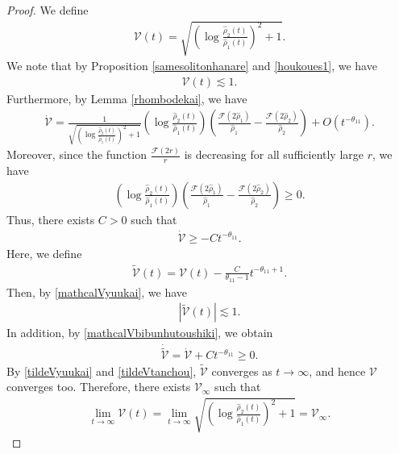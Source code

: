 \documentclass[10pt,a4paper]{amsart}
\numberwithin{equation}{section}
\begin{document}
\begin{proof}
We define
\begin{align}\label{mathcalVdef}
\mathcal{V}(t)=\sqrt{ \left(\log{\frac{\hat{\rho}_2(t)}{\hat{\rho}_1(t)}}\right)^2+1}.
\end{align}
We note that by Proposition \ref{samesolitonhanare} and \eqref{houkoues1}, we have
\begin{align}\label{mathcalVyuukai}
\mathcal{V}(t)\lesssim 1.
\end{align}
Furthermore, by Lemma \ref{rhombodekai}, we have
\begin{align*}
\dot{\mathcal{V}}=\frac{1}{\sqrt{ \left(\log{\frac{\hat{\rho}_2(t)}{\hat{\rho}_1(t)}}\right)^2+1}}\left(\log{\frac{\hat{\rho}_2(t)}{\hat{\rho}_1(t)}} \right)\left(\frac{\mathcal{F}(2\hat{\rho}_1)}{\hat{\rho}_1}-\frac{\mathcal{F}(2\hat{\rho}_2)}{\hat{\rho}_2}\right)+O\left(t^{-\theta_{11}}\right).
\end{align*}
Moreover, since the function $\frac{\mathcal{F}(2r)}{r}$ is decreasing for all sufficiently large $r$, we have
\begin{align*}
\left(\log{\frac{\hat{\rho}_2(t)}{\hat{\rho}_1(t)}} \right)\left(\frac{\mathcal{F}(2\hat{\rho}_1)}{\hat{\rho}_1}-\frac{\mathcal{F}(2\hat{\rho}_2)}{\hat{\rho}_2}\right)\geq 0.
\end{align*}
Thus, there exists $C>0$ such that
\begin{align}\label{mathcalVbibunhutoushiki}
\dot{\mathcal{V}}\geq -Ct^{-\theta_{11}}.
\end{align}
Here, we define 
\begin{align*}
\tilde{\mathcal{V}}(t)=\mathcal{V}(t)-\frac{C}{\theta_{11}-1}t^{-\theta_{11}+1}.
\end{align*}
Then, by \eqref{mathcalVyuukai}, we have
\begin{align}\label{tildeVyuukai}
\left|\tilde{\mathcal{V}}(t)\right|\lesssim 1.
\end{align}
In addition, by \eqref{mathcalVbibunhutoushiki}, we obtain
\begin{align}\label{tildeVtanchou}
\dot{\tilde{\mathcal{V}}}=\dot{\mathcal{V}}+Ct^{-\theta_{11}}\geq 0. 
\end{align}
By \eqref{tildeVyuukai} and \eqref{tildeVtanchou}, $\tilde{\mathcal{V}}$ converges as $t\to\infty$, and hence $\mathcal{V}$ converges too. Therefore, there exists $\mathcal{V}_{\infty}$ such that
\begin{align*}
\lim_{t\to\infty}\mathcal{V}(t)=\lim_{t\to\infty}\sqrt{ \left(\log{\frac{\hat{\rho}_2(t)}{\hat{\rho}_1(t)}}\right)^2+1}=\mathcal{V}_{\infty}.

\end{align*}
\end{proof}
\end{document}

